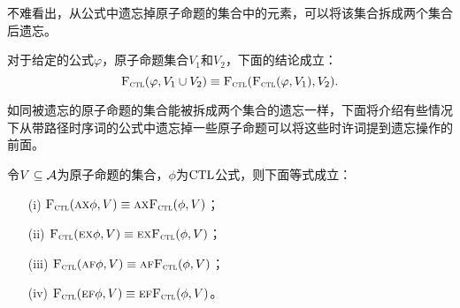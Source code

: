 不难看出，从公式中遗忘掉原子命题的集合中的元素，可以将该集合拆成两个集合后遗忘。
\begin{corollary}
	对于给定的公式$\varphi$，原子命题集合$V_1$和$V_2$，下面的结论成立：
	\[
	{\textsc{F}_{\textsc{ctl}}}(\varphi,V_1\cup V_2) \equiv {\textsc{F}_{\textsc{ctl}}}({\textsc{F}_{\textsc{ctl}}}(\varphi,V_1),V_2).
	\]
\end{corollary}

如同被遗忘的原子命题的集合能被拆成两个集合的遗忘一样，下面将介绍有些情况下从带路径时序词的公式中遗忘掉一些原子命题可以将这些时许词提到遗忘操作的前面。
\begin{proposition}
	令$V\subseteq {\cal A}$为原子命题的集合，$\phi$为$\textrm{CTL}$公式，则下面等式成立：
	\begin{itemize}
		\item[(i)] ${\textsc{F}_{\textsc{ctl}}}(\textsc{a}\textsc{x}\phi,V) \equiv \textsc{a} \textsc{x}{\textsc{F}_{\textsc{ctl}}}(\phi,V)$；
		\item[(ii)] ${\textsc{F}_{\textsc{ctl}}}(\textsc{e}\textsc{x}\phi,V) \equiv \textsc{e} \textsc{x}{\textsc{F}_{\textsc{ctl}}}(\phi,V)$；
		\item[(iii)] ${\textsc{F}_{\textsc{ctl}}}(\textsc{a}\textsc{f}\phi,V) \equiv \textsc{a}\textsc{f}{\textsc{F}_{\textsc{ctl}}}(\phi,V)$；
		\item[(iv)] ${\textsc{F}_{\textsc{ctl}}}(\textsc{e}\textsc{f}\phi,V) \equiv \textsc{e}\textsc{f}{\textsc{F}_{\textsc{ctl}}}(\phi,V)$。
	\end{itemize}
\end{proposition}
